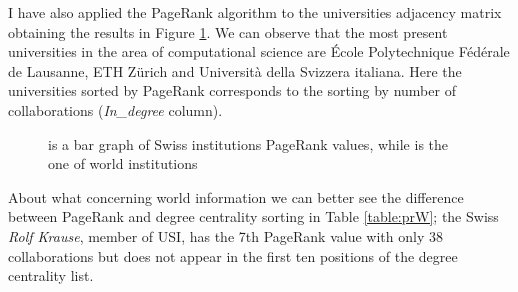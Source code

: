 \documentclass[]{usiinfbachelorproject}
\begin{document}
I have also applied the PageRank algorithm to the universities adjacency matrix obtaining the results in Figure \ref{fig:PRUniversities}.
We can observe that the most present universities in the area of computational science are \'{E}cole Polytechnique F\'{e}d\'{e}rale de Lausanne, ETH Z\"{u}rich and Universit\`{a} della Svizzera italiana. Here the universities sorted by PageRank corresponds to the  sorting by number of collaborations (\textit{In\_degree} column).
\begin{figure}[tb]
	\centering
	\caption{  is a bar graph of Swiss institutions PageRank values, while   is the one of world institutions}
	\label{fig:PRUniversities}
\end{figure}


About what concerning world information we can better see the difference between PageRank and degree centrality sorting in Table \ref{table:prW}; the Swiss  \textit{Rolf Krause}, member of USI, has the 7th PageRank value with only 38 collaborations but does not appear in the first ten positions of the degree centrality list.
\end{document}
